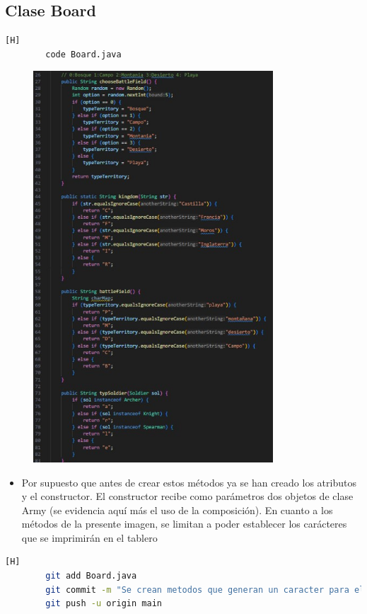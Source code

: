 \documentclass{article}
\begin{document}
	
	

	\subsection{Clase Board}
	
	\begin{lstlisting}[language=bash,caption={Se crean los métodos que generan caracteres para el tablero}][H]
		code Board.java
	\end{lstlisting}
	\begin{figure}[H]
		\centering
		\includegraphics[width=0.8\textwidth,keepaspectratio]{img/chars.jpg}
	\end{figure}
	\begin{itemize}	
		\item Por supuesto que antes de crear estos métodos ya se han creado los atributos y el constructor. El constructor recibe como parámetros dos objetos de clase Army  (se evidencia aquí más el uso de la composición). En cuanto a los métodos de la presente imagen, se limitan a poder establecer los carácteres que se imprimirán en el tablero
	\end{itemize}	
	\begin{lstlisting}[language=bash,caption={Commit: 4c61c72b558e8335ed0dda950c796c2caaa121e0 }][H]
		git add Board.java
		git commit -m "Se crean metodos que generan un caracter para el tablero"			
		git push -u origin main
	\end{lstlisting}
	
\end{document}
